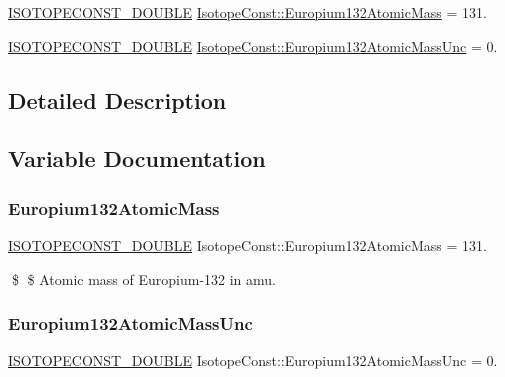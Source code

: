 \begin{DoxyCompactItemize}
\item 
\mbox{\hyperlink{group___isotope_const-_macros_ga8f45a7272ce02c0b4c65c44636ed719a}{I\+S\+O\+T\+O\+P\+E\+C\+O\+N\+S\+T\+\_\+\+D\+O\+U\+B\+LE}} \mbox{\hyperlink{group___isotope_const-_europium-_eu132_ga0374f887a0bb584d2d00038d2efaae60}{Isotope\+Const\+::\+Europium132\+Atomic\+Mass}} = 131.
\item 
\mbox{\hyperlink{group___isotope_const-_macros_ga8f45a7272ce02c0b4c65c44636ed719a}{I\+S\+O\+T\+O\+P\+E\+C\+O\+N\+S\+T\+\_\+\+D\+O\+U\+B\+LE}} \mbox{\hyperlink{group___isotope_const-_europium-_eu132_ga8a9200afc991126d17f44fdd45ae64ee}{Isotope\+Const\+::\+Europium132\+Atomic\+Mass\+Unc}} = 0.
\end{DoxyCompactItemize}


\subsection{Detailed Description}


\subsection{Variable Documentation}
\mbox{\label{group___isotope_const-_europium-_eu132_ga0374f887a0bb584d2d00038d2efaae60}} 
\subsubsection{\texorpdfstring{Europium132\+Atomic\+Mass}{Europium132AtomicMass}}
{\footnotesize\ttfamily \mbox{\hyperlink{group___isotope_const-_macros_ga8f45a7272ce02c0b4c65c44636ed719a}{I\+S\+O\+T\+O\+P\+E\+C\+O\+N\+S\+T\+\_\+\+D\+O\+U\+B\+LE}} Isotope\+Const\+::\+Europium132\+Atomic\+Mass = 131.}

\$ \$ Atomic mass of Europium-\/132 in amu. \mbox{\label{group___isotope_const-_europium-_eu132_ga8a9200afc991126d17f44fdd45ae64ee}} 
\subsubsection{\texorpdfstring{Europium132\+Atomic\+Mass\+Unc}{Europium132AtomicMassUnc}}
{\footnotesize\ttfamily \mbox{\hyperlink{group___isotope_const-_macros_ga8f45a7272ce02c0b4c65c44636ed719a}{I\+S\+O\+T\+O\+P\+E\+C\+O\+N\+S\+T\+\_\+\+D\+O\+U\+B\+LE}} Isotope\+Const\+::\+Europium132\+Atomic\+Mass\+Unc = 0.}

